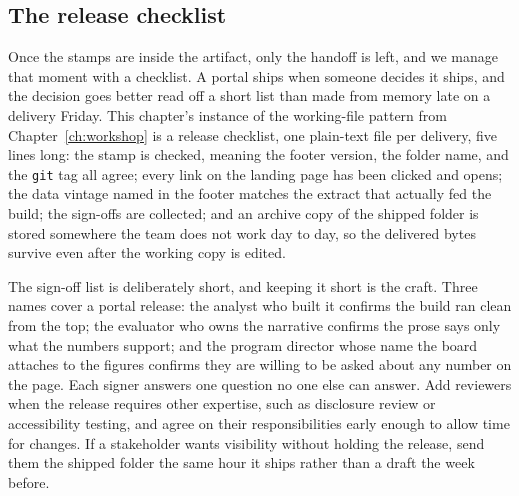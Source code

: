 \documentclass[
    a4paper,
    fontsize=10pt,
    twoside=true,
    numbers=noenddot,
]{kaobook}
\begin{document}
\subsection{The release checklist}\label{ch12-sc-release}
Once the stamps are inside the artifact, only the handoff is left, and we manage that moment with a checklist. A portal ships when someone decides it ships, and the decision goes better read off a short list than made from memory late on a delivery Friday. This chapter's instance of the working-file pattern from Chapter~\ref{ch:workshop} is a release checklist, one plain-text file per delivery, five lines long: the stamp is checked, meaning the footer version, the folder name, and the \texttt{git} tag all agree; every link on the landing page has been clicked and opens; the data vintage named in the footer matches the extract that actually fed the build; the sign-offs are collected; and an archive copy of the shipped folder is stored somewhere the team does not work day to day, so the delivered bytes survive even after the working copy is edited.

The sign-off list is deliberately short, and keeping it short is the craft. Three names cover a portal release: the analyst who built it confirms the build ran clean from the top; the evaluator who owns the narrative confirms the prose says only what the numbers support; and the program director whose name the board attaches to the figures confirms they are willing to be asked about any number on the page. Each signer answers one question no one else can answer. Add reviewers when the release requires other expertise, such as disclosure review or accessibility testing, and agree on their responsibilities early enough to allow time for changes. If a stakeholder wants visibility without holding the release, send them the shipped folder the same hour it ships rather than a draft the week before.
\end{document}
